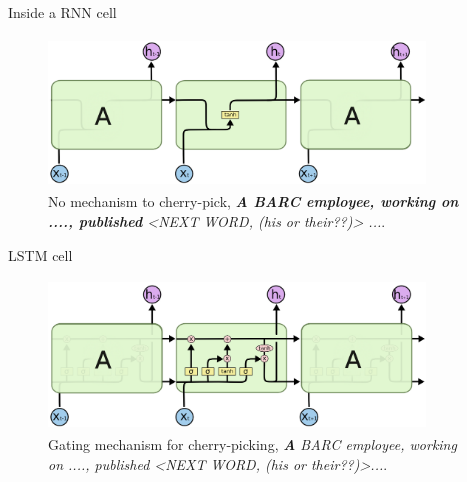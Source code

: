 \documentclass{beamer}
\begin{document}
\begin{frame}{Inside a RNN cell}
    \begin{center}
        \begin{figure}
            \centering
                \includegraphics[width=10cm, height=4cm]{images/rnn_layer_colah.png} 
                \caption{No mechanism to cherry-pick,  \textit{\textbf{A BARC employee, working on ...., published} \big<NEXT WORD, \textit{(his or their??)}\big> ...}.}
        \end{figure}
        
    \end{center}
\end{frame}

\begin{frame}{LSTM cell}
    \begin{center}
        \begin{figure}
            \centering
                \includegraphics[width=10cm, height=4cm]{images/lstm_layer_colah.png}    
                \caption{Gating mechanism for cherry-picking,  \textit{\textbf{A} BARC employee, working on ...., published \big<NEXT WORD, \textit{(his or their??)}\big>...}.}
        \end{figure}
    \end{center}
    
\end{frame}
\end{document}
